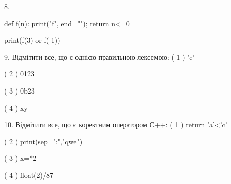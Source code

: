 \documentclass[11pt]{article}
\begin{document}
8. 

def f(n):
    print("f", end="");
    return n<=0

print(f(3) or f(-1))
\vspace{5mm}

9. %
Відмітити все, що є однією правильною лексемою:
( 1 ) 'c'

( 2 ) 0123

( 3 ) 0b23

( 4 ) xy
\vspace{5mm}

10. %
Відмітити все, що є коректним оператором С++:
( 1 ) return 'a'<'c'

( 2 ) print(sep=":","qwe")

( 3 ) x=*2

( 4 ) float(2)/87
\vspace{5mm}

\newpage
\end{document}
